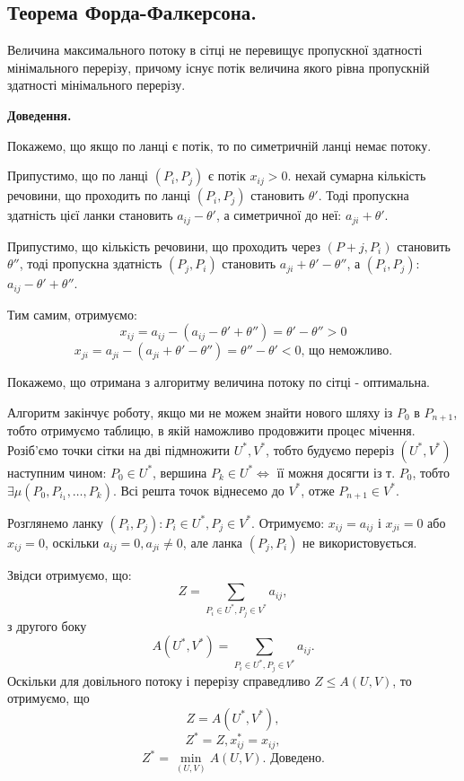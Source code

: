 \documentclass[12pt,a4paper]{book}
\begin{document}
\subsection{Теорема Форда-Фалкерсона.}

Величина максимального потоку в сітці не перевищує пропускної здатності мінімального перерізу, причому існує потік величина якого рівна пропускній здатності мінімального перерізу.

{\bf Доведення.}

Покажемо, що якщо по ланці є потік, то по симетричній ланці немає потоку.

Припустимо, що по ланці $(P_i, P_j)$ є потік $x_{ij}>0$. нехай сумарна кількість речовини, що проходить по ланці $(P_i, P_j)$ становить $\theta'$. Тоді пропускна здатність цієї ланки становить $a_{ij} - \theta'$, а симетричної до неї: $a_{ji} + \theta'$.

Припустимо, що кількість речовини, що проходить через $(P+j, P_i)$ становить $\theta''$, тоді пропускна здатність $(P_j, P_i)$ становить $a_{ji}+\theta'-\theta''$, а $(P_i, P_j)$: $a_{ij}-\theta'+\theta''$.

Тим самим, отримуємо:
\[ x_{ij} = a_{ij} - (a_{ij} - \theta' + \theta'') = \theta' - \theta'' > 0 \]
\[ x_{ji} = a_{ji} - (a_{ji} + \theta' - \theta'') = \theta'' - \theta' < 0 \mbox{, що неможливо.}\]

Покажемо, що отримана з алгоритму величина потоку по сітці - оптимальна.

Алгоритм закінчує роботу, якщо ми не можем знайти нового шляху із $P_0$ в $P_{n+1}$, тобто отримуємо таблицю, в якій наможливо продовжити процес мічення. Розіб’ємо точки сітки на дві підмножити $U^*, V^*$, тобто будуємо переріз $(U^*, V^*)$ наступним чином: $P_0 \in U^*$, вершина $P_k \in U^* \Leftrightarrow$ її можня досягти із т. $P_0$, тобто $\exists \mu(P_0, P_{i_1}, \dots, P_k)$. Всі решта точок віднесемо до $V^*$, отже $P_{n+1} \in V^*$.

Розглянемо ланку $(P_i, P_j): P_i \in U^*, P_j \in V^*$. Отримуємо: $x_{ij}=a_{ij}$ і $x_{ji}=0$ або $x_{ij}=0$, оскільки $a_{ij}=0, a_{ji} \neq 0$, але ланка $(P_j, P_i)$ не використовується.

Звідси отримуємо, що: 
\[ Z= \sum_{P_i \in U^*, P_j \in V^*} a_{ij}, \]
з другого боку
\[ A(U^*, V^*) = \sum_{P_i \in U^*, P_j \in V^*} a_{ij}. \]
Оскільки для довільного потоку і перерізу справедливо $Z \le A(U, V)$, то отримуємо, що 
\[ Z = A(U^*, V^*), \]
\[ Z^*=Z, x_{ij}^*=x_{ij}, \]
\[ Z^*=\min_{(U,V)} A(U,V). \mbox{ Доведено.}\]
\end{document}
